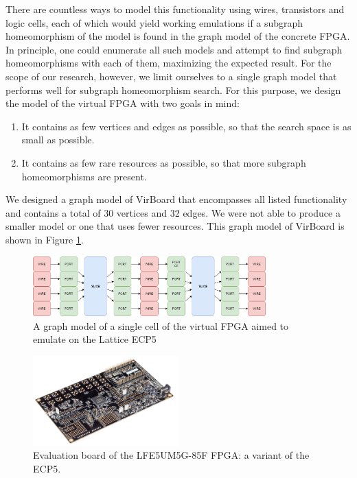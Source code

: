 There are countless ways to model this functionality using wires, transistors and logic cells, each of which would yield working emulations if a subgraph homeomorphism of the model is found in the graph model of the concrete FPGA. In principle, one could enumerate all such models and attempt to find subgraph homeomorphisms with each of them, maximizing the expected result. For the scope of our research, however, we limit ourselves to a single graph model that performs well for subgraph homeomorphism search. For this purpose, we design the model of the virtual FPGA with two goals in mind:

\begin{enumerate}
\item It contains as few vertices and edges as possible, so that the search space is as small as possible.
\item It contains as few rare resources as possible, so that more subgraph homeomorphisms are present.
\end{enumerate}

We designed a graph model of VirBoard that encompasses all listed functionality and contains a total of 30 vertices and 32 edges. We were not able to produce a smaller model or one that uses fewer resources. This graph model of VirBoard is shown in Figure \ref{fig:virboard}.

\begin{figure}
\centering
\includegraphics[width=0.8\textwidth]{images/virtualFPGA2.png}
\caption{A graph model of a single cell of the virtual FPGA aimed to emulate on the Lattice ECP5}
\label{fig:virboard}
\end{figure}	


\begin{figure}
\centering
\includegraphics[width=0.5\textwidth]{images/ECP5.png}
\caption[Evaluation board of the LFE5UM5G-85F FPGA: a variant of the ECP5.]{Evaluation board of the LFE5UM5G-85F FPGA: a variant of the ECP5.\footnotemark}
\label{fig:evaluationboard}
\end{figure}


